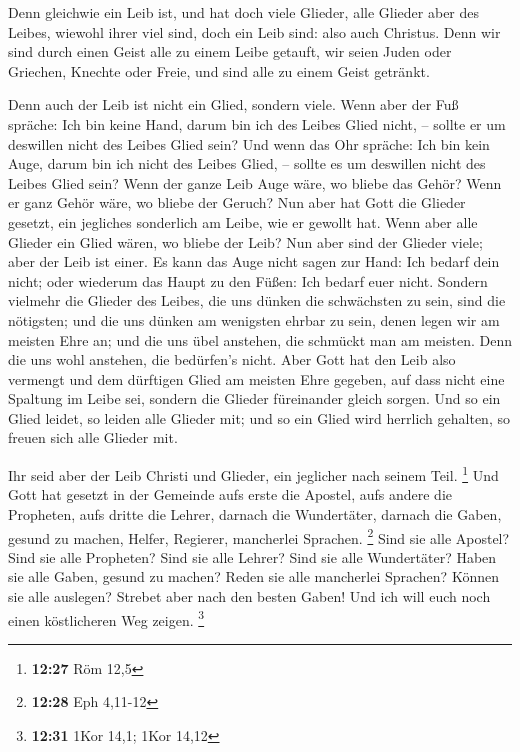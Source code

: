  Denn gleichwie ein Leib ist, und hat doch viele Glieder,
alle Glieder aber des Leibes, wiewohl ihrer viel sind, doch ein Leib
sind: also auch Christus.  Denn wir sind durch einen Geist
alle zu einem Leibe getauft, wir seien Juden oder Griechen, Knechte oder
Freie, und sind alle zu einem Geist getränkt.

 Denn auch der Leib ist nicht ein Glied, sondern viele.
 Wenn aber der Fuß spräche: Ich bin keine Hand, darum bin
ich des Leibes Glied nicht, -- sollte er um deswillen nicht des Leibes
Glied sein?  Und wenn das Ohr spräche: Ich bin kein Auge,
darum bin ich nicht des Leibes Glied, -- sollte es um deswillen nicht
des Leibes Glied sein?  Wenn der ganze Leib Auge wäre, wo
bliebe das Gehör? Wenn er ganz Gehör wäre, wo bliebe der Geruch?
 Nun aber hat Gott die Glieder gesetzt, ein jegliches
sonderlich am Leibe, wie er gewollt hat.  Wenn aber alle
Glieder ein Glied wären, wo bliebe der Leib?  Nun aber sind
der Glieder viele; aber der Leib ist einer.  Es kann das
Auge nicht sagen zur Hand: Ich bedarf dein nicht; oder wiederum das
Haupt zu den Füßen: Ich bedarf euer nicht.  Sondern
vielmehr die Glieder des Leibes, die uns dünken die schwächsten zu sein,
sind die nötigsten;  und die uns dünken am wenigsten ehrbar
zu sein, denen legen wir am meisten Ehre an; und die uns übel anstehen,
die schmückt man am meisten.  Denn die uns wohl anstehen,
die bedürfen's nicht. Aber Gott hat den Leib also vermengt und dem
dürftigen Glied am meisten Ehre gegeben,  auf dass nicht
eine Spaltung im Leibe sei, sondern die Glieder füreinander gleich
sorgen.  Und so ein Glied leidet, so leiden alle Glieder
mit; und so ein Glied wird herrlich gehalten, so freuen sich alle
Glieder mit.

 Ihr seid aber der Leib Christi und Glieder, ein jeglicher
nach seinem Teil. \footnote{\textbf{12:27} Röm 12,5}  Und
Gott hat gesetzt in der Gemeinde aufs erste die Apostel, aufs andere die
Propheten, aufs dritte die Lehrer, darnach die Wundertäter, darnach die
Gaben, gesund zu machen, Helfer, Regierer, mancherlei Sprachen.
\footnote{\textbf{12:28} Eph 4,11-12}  Sind sie alle
Apostel? Sind sie alle Propheten? Sind sie alle Lehrer? Sind sie alle
Wundertäter?  Haben sie alle Gaben, gesund zu machen? Reden
sie alle mancherlei Sprachen? Können sie alle auslegen? 
Strebet aber nach den besten Gaben! Und ich will euch noch einen
köstlicheren Weg zeigen. \footnote{\textbf{12:31} 1Kor 14,1; 1Kor 14,12}

